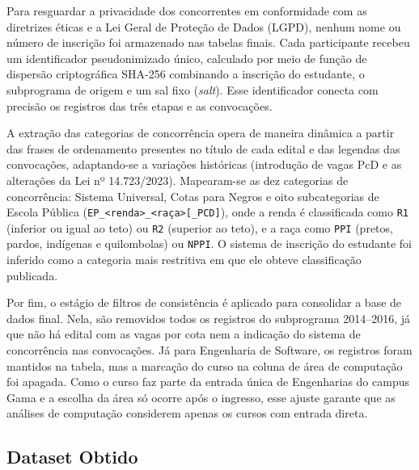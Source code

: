 \documentclass[12pt]{article}
\begin{document}
Para resguardar a privacidade dos concorrentes em conformidade com as diretrizes éticas e a Lei Geral de Proteção de Dados (LGPD), nenhum nome ou número de inscrição foi armazenado nas tabelas finais. Cada participante recebeu um identificador pseudonimizado único, calculado por meio de função de dispersão criptográfica SHA-256 combinando a inscrição do estudante, o subprograma de origem e um sal fixo (\textit{salt}). Esse identificador conecta com precisão os registros das três etapas e as convocações.

A extração das categorias de concorrência opera de maneira dinâmica a partir das frases de ordenamento presentes no título de cada edital e das legendas das convocações, adaptando-se a variações históricas (introdução de vagas PcD e as alterações da Lei nº 14.723/2023). Mapearam-se as dez categorias de concorrência: Sistema Universal, Cotas para Negros e oito subcategorias de Escola Pública (\texttt{EP\_<renda>\_<raça>[\_PCD]}), onde a renda é classificada como \texttt{R1} (inferior ou igual ao teto) ou \texttt{R2} (superior ao teto), e a raça como \texttt{PPI} (pretos, pardos, indígenas e quilombolas) ou \texttt{NPPI}. O sistema de inscrição do estudante foi inferido como a categoria mais restritiva em que ele obteve classificação publicada.

Por fim, o estágio de filtros de consistência é aplicado para consolidar a base de dados final. Nela, são removidos todos os registros do subprograma 2014--2016, já que não há edital com as vagas por cota nem a indicação do sistema de concorrência nas convocações. Já para Engenharia de Software, os registros foram mantidos na tabela, mas a marcação do curso na coluna de área de computação foi apagada. Como o curso faz parte da entrada única de Engenharias do campus Gama e a escolha da área só ocorre após o ingresso, esse ajuste garante que as análises de computação considerem apenas os cursos com entrada direta.

\subsection{Dataset Obtido}
\end{document}
